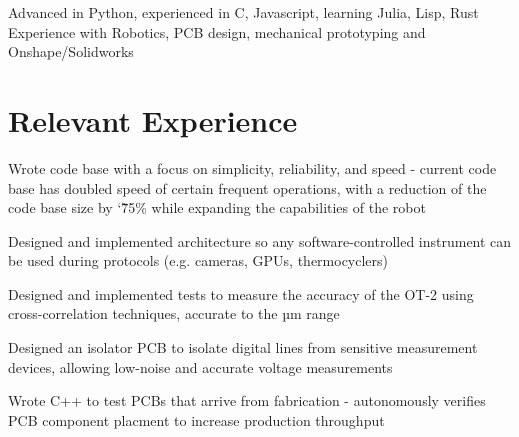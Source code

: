 \documentclass[]{deedy-resume-openfont}
\begin{document}

\begin{minipage}[t]{\textwidth}
	 Advanced in Python, experienced in C, Javascript, learning Julia, Lisp, Rust\\
   Experience with Robotics, PCB design, mechanical prototyping and Onshape/Solidworks
\end{minipage}

\vspace{12pt}

\section{Relevant Experience}

\begin{tightemize}
    \item Wrote code base with a focus on simplicity, reliability, and speed - current code base has doubled speed of certain frequent operations, with a reduction of the code base size by \char`\~ 75\% while expanding the capabilities of the robot
    \item Designed and implemented architecture so any software-controlled instrument can be used during protocols (e.g. cameras, GPUs, thermocyclers)
    \item Designed and implemented tests to measure the accuracy of the OT-2 using cross-correlation techniques, accurate to the µm range
\end{tightemize}

\vspace{8pt}

\begin{tightemize}
    \item Designed an isolator PCB to isolate digital lines from sensitive measurement devices, allowing low-noise and accurate voltage measurements
    \item Wrote C++ to test PCBs that arrive from fabrication - autonomously verifies PCB component placment to increase production throughput
\end{tightemize}
\end{document}
